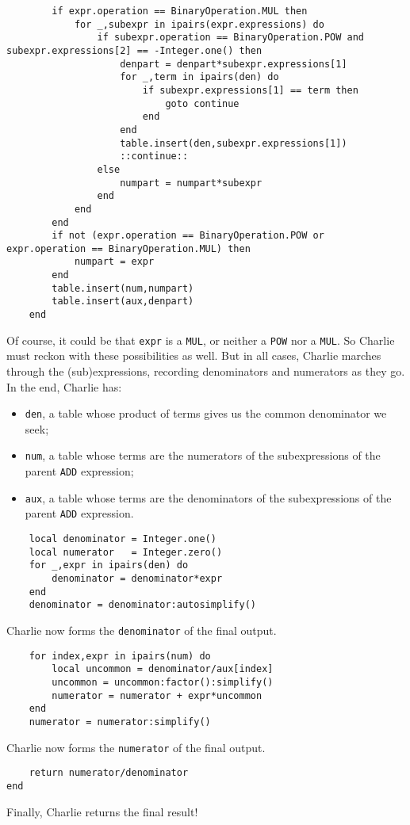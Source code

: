 \documentclass{article}
\begin{document}
\begin{verbatim}
        if expr.operation == BinaryOperation.MUL then 
            for _,subexpr in ipairs(expr.expressions) do 
                if subexpr.operation == BinaryOperation.POW and subexpr.expressions[2] == -Integer.one() then
                    denpart = denpart*subexpr.expressions[1]    
                    for _,term in ipairs(den) do 
                        if subexpr.expressions[1] == term then 
                            goto continue
                        end
                    end
                    table.insert(den,subexpr.expressions[1])
                    ::continue::
                else 
                    numpart = numpart*subexpr 
                end
            end
        end
        if not (expr.operation == BinaryOperation.POW or expr.operation == BinaryOperation.MUL) then 
            numpart = expr 
        end
        table.insert(num,numpart)
        table.insert(aux,denpart)
    end
\end{verbatim}
Of course, it could be that \texttt{expr} is a \texttt{MUL}, or  neither a \texttt{POW} nor a \texttt{MUL}. So Charlie must reckon with these possibilities as well. But in all cases, Charlie marches through the (sub)expressions, recording denominators and numerators as they go. In the end, Charlie has:
\begin{itemize}
    \item \texttt{den}, a table whose product of terms gives us the common denominator we seek;
    \item \texttt{num}, a table whose terms are the numerators of the subexpressions of the parent \texttt{ADD} expression;
    \item \texttt{aux}, a table whose terms are the denominators of the subexpressions of the parent \texttt{ADD} expression.
\end{itemize}
\begin{verbatim}
    local denominator = Integer.one()
    local numerator   = Integer.zero()
    for _,expr in ipairs(den) do 
        denominator = denominator*expr
    end
    denominator = denominator:autosimplify()
\end{verbatim}
Charlie now forms the \texttt{denominator} of the final output. 
\begin{verbatim}
    for index,expr in ipairs(num) do
        local uncommon = denominator/aux[index]
        uncommon = uncommon:factor():simplify()
        numerator = numerator + expr*uncommon
    end
    numerator = numerator:simplify()
\end{verbatim}
Charlie now forms the \texttt{numerator} of the final output.
\begin{verbatim}
    return numerator/denominator
end
\end{verbatim}
Finally, Charlie returns the final result!
\end{document}
